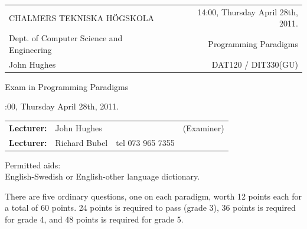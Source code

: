 \documentclass{article}
\begin{document}
\newcommand{\examtime}{14:00, Thursday April 28th, 2011}
\newcommand{\points}[1]{\marginpar{\bf #1 points}}
\noindent
\begin{tabular}{lr}
CHALMERS TEKNISKA H\"OGSKOLA &\examtime{}.\\
Dept. of Computer Science and Engineering & Programming Paradigms\\
John Hughes                  & DAT120 / DIT330(GU) \\
\end{tabular}

\vspace{2.5cm} \noindent
\begin{center} {\LARGE
Exam in Programming Paradigms}
\end{center}

\vspace{1.5cm}

\noindent
\examtime{}.\\
\begin{tabular}{lllc}
\textbf{Lecturer:} &  John Hughes  & & (Examiner)\\
\textbf{Lecturer:} & Richard Bubel & tel 073 965 7355 & \\ 
\end{tabular}
\vspace{1cm}

\noindent
Permitted aids:\\
English-Swedish or English-other language dictionary.

There are five ordinary questions, one on each paradigm, worth 12
points each for a total of 60 points. 24 points is required to pass
(grade 3), 36 points is required for grade 4, and 48 points is
required for grade 5.

\newcommand{\comment}[1]{\marginpar{#1}}

\newpage
\end{document}
